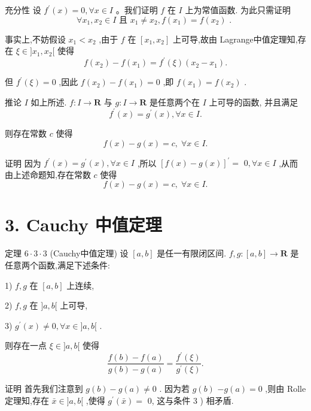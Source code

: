 充分性 设 ${f}^{\prime }\left( x\right)  = 0,\forall x \in  I$ 。我们证明 $f$ 在 $I$ 上为常值函数. 为此只需证明
$$\forall {x}_{1},{x}_{2} \in  I\text{ 且 }{x}_{1} \neq  {x}_{2},f\left( {x}_{1}\right)  = f\left( {x}_{2}\right) \text{ . }$$

事实上,不妨假设 ${x}_{1} < {x}_{2}$ ,由于 $f$ 在 $\left\lbrack  {{x}_{1},{x}_{2}}\right\rbrack$ 上可导,故由 Lagrange中值定理知,存在 $\xi  \in  \rbrack {x}_{1},{x}_{2}\lbrack$ 使得
$$f\left( {x}_{2}\right)  - f\left( {x}_{1}\right)  = {f}^{\prime }\left( \xi \right) \left( {{x}_{2} - {x}_{1}}\right) .$$

但 ${f}^{\prime }\left( \xi \right)  = 0$ ,因此 $f\left( {x}_{2}\right)  - f\left( {x}_{1}\right)  = 0$ ,即 $f\left( {x}_{1}\right)  = f\left( {x}_{2}\right)$ .

推论 $I$ 如上所述. $f : I \rightarrow  \mathbf{R}$ 与 $g : I \rightarrow  \mathbf{R}$ 是任意两个在 $I$ 上可导的函数, 并且满足
$${f}^{\prime }\left( x\right)  = {g}^{\prime }\left( x\right) ,\forall x \in  I.$$

则存在常数 $c$ 使得
$$f\left( x\right)  - g\left( x\right)  = c,\;\forall x \in  I.$$

证明 因为 ${f}^{\prime }\left( x\right)  = {g}^{\prime }\left( x\right) ,\forall x \in  I$ ,所以 ${\left\lbrack  f\left( x\right)  - g\left( x\right) \right\rbrack  }^{\prime } =$  $0,\forall x \in  I$ ,从而由上述命题知,存在常数 $c$ 使得
$$f\left( x\right)  - g\left( x\right)  = c,\;\forall x \in  I.$$

\section*{3. Cauchy 中值定理}

定理 $6 \cdot  3 \cdot  3$ (Cauchy中值定理) 设 $\left\lbrack  {a,b}\right\rbrack$ 是任一有限闭区间. $f,g : \left\lbrack  {a,b}\right\rbrack   \rightarrow  \mathbf{R}$ 是任意两个函数,满足下述条件:

1) $f,g$ 在 $\left\lbrack  {a,b}\right\rbrack$ 上连续,

2) $f,g$ 在 $\rbrack a,b\lbrack$ 上可导,

3) ${g}^{\prime }\left( x\right)  \neq  0,\forall x \in  \rbrack a,b\lbrack$ .

则存在一点 $\xi  \in  \rbrack a,b\lbrack$ 使得
$$\frac{f\left( b\right)  - f\left( a\right) }{g\left( b\right)  - g\left( a\right) } = \frac{{f}^{\prime }\left( \xi \right) }{{g}^{\prime }\left( \xi \right) }.$$

证明 首先我们注意到 $g\left( b\right)  - g\left( a\right)  \neq  0$ . 因为若 $g\left( b\right)$  $- g\left( a\right)  = 0$ ,则由 Rolle 定理知,存在 $\bar{x} \in  \rbrack a,b\lbrack$ ,使得 ${g}^{\prime }\left( \bar{x}\right)  =$ 0, 这与条件 3 ) 相矛盾.


